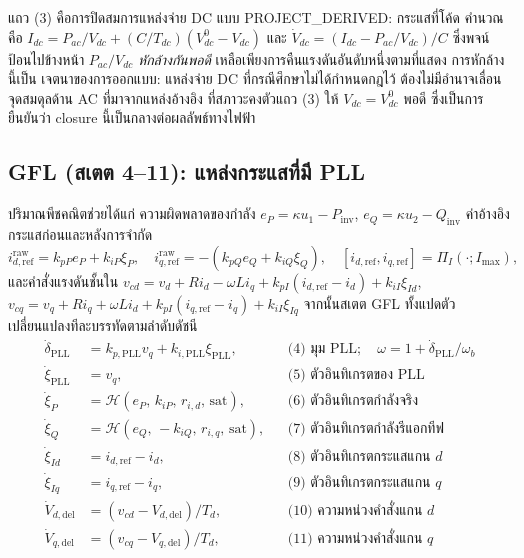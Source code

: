 \documentclass[12pt,a4paper]{article}
\begin{document}
แถว (3) คือการปิดสมการแหล่งจ่าย DC แบบ \textsf{PROJECT\_DERIVED}: กระแสที่โค้ด
คำนวณคือ $I_{dc}=P_{ac}/V_{dc}+(C/T_{dc})(V_{dc}^{0}-V_{dc})$ และ
$\dot V_{dc}=(I_{dc}-P_{ac}/V_{dc})/C$ ซึ่งพจน์ป้อนไปข้างหน้า $P_{ac}/V_{dc}$
\emph{หักล้างกันพอดี} เหลือเพียงการคืนแรงดันอันดับหนึ่งตามที่แสดง การหักล้างนี้เป็น
เจตนาของการออกแบบ: แหล่งจ่าย DC ที่กรณีศึกษาไม่ได้กำหนดกฎไว้ ต้องไม่มีอำนาจเลื่อน
จุดสมดุลด้าน AC ที่มาจากแหล่งอ้างอิง ที่สภาวะคงตัวแถว (3) ให้ $V_{dc}=V_{dc}^{0}$
พอดี ซึ่งเป็นการยืนยันว่า closure นี้เป็นกลางต่อผลลัพธ์ทางไฟฟ้า

\subsection{GFL (สเตต 4--11): แหล่งกระแสที่มี PLL}
ปริมาณพีชคณิตช่วยได้แก่ ความผิดพลาดของกำลัง
$e_P=\kappa u_1-P_{\mathrm{inv}}$, $e_Q=\kappa u_2-Q_{\mathrm{inv}}$
ค่าอ้างอิงกระแสก่อนและหลังการจำกัด
\begin{equation}
  i_{d,\mathrm{ref}}^{\mathrm{raw}}=k_{pP}e_P+k_{iP}\xi_P,\quad
  i_{q,\mathrm{ref}}^{\mathrm{raw}}=-(k_{pQ}e_Q+k_{iQ}\xi_Q),\quad
  [i_{d,\mathrm{ref}},i_{q,\mathrm{ref}}]=\Pi_I(\cdot;I_{\max}),
\end{equation}
และคำสั่งแรงดันชั้นใน
$v_{cd}=v_d+R i_d-\omega L i_q+k_{pI}(i_{d,\mathrm{ref}}-i_d)+k_{iI}\xi_{Id}$,
$v_{cq}=v_q+R i_q+\omega L i_d+k_{pI}(i_{q,\mathrm{ref}}-i_q)+k_{iI}\xi_{Iq}$
จากนั้นสเตต GFL ทั้งแปดตัวเปลี่ยนแปลงทีละบรรทัดตามลำดับดัชนี
\begin{align}
  \dot{\delta}_{\mathrm{PLL}} &= k_{p,\mathrm{PLL}}v_q+k_{i,\mathrm{PLL}}\xi_{\mathrm{PLL}},
     &&\text{(4) มุม PLL};\quad \omega=1+\dot\delta_{\mathrm{PLL}}/\omega_b\\
  \dot{\xi}_{\mathrm{PLL}} &= v_q, &&\text{(5) ตัวอินทิเกรตของ PLL}\\
  \dot{\xi}_P &= \mathcal{H}(e_P,\,k_{iP},\,r_{i,d},\,\text{sat}),
     &&\text{(6) ตัวอินทิเกรตกำลังจริง}\\
  \dot{\xi}_Q &= \mathcal{H}(e_Q,\,-k_{iQ},\,r_{i,q},\,\text{sat}),
     &&\text{(7) ตัวอินทิเกรตกำลังรีแอกทีฟ}\\
  \dot{\xi}_{Id} &= i_{d,\mathrm{ref}}-i_d, &&\text{(8) ตัวอินทิเกรตกระแสแกน $d$}\\
  \dot{\xi}_{Iq} &= i_{q,\mathrm{ref}}-i_q, &&\text{(9) ตัวอินทิเกรตกระแสแกน $q$}\\
  \dot{V}_{d,\mathrm{del}} &= (v_{cd}-V_{d,\mathrm{del}})/T_d, &&\text{(10) ความหน่วงคำสั่งแกน $d$}\\
  \dot{V}_{q,\mathrm{del}} &= (v_{cq}-V_{q,\mathrm{del}})/T_d, &&\text{(11) ความหน่วงคำสั่งแกน $q$}
\end{align}
\end{document}
